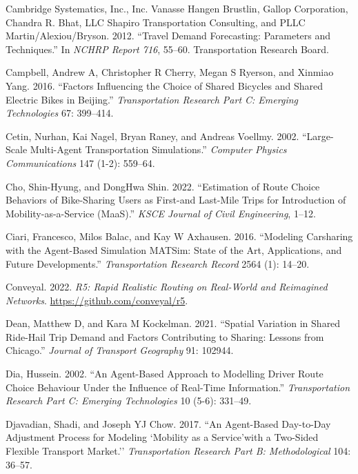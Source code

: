 \documentclass[12pt, oneside, openright]{byuthesis}
\newlength{\cslhangindent}
\newlength{\cslentryspacingunit} %
\newenvironment{CSLReferences}[2] %
 {%
  \setlength{\parindent}{0pt}
  \ifodd #1
  \let\oldpar\par
  \def\par{\hangindent=\cslhangindent\oldpar}
  \fi
  \setlength{\parskip}{#2\cslentryspacingunit}
 }%
 {}
\begin{document}
\begin{CSLReferences}{1}{0}
\leavevmode{}%
Cambridge Systematics, Inc., Inc. Vanasse Hangen Brustlin, Gallop Corporation, Chandra R. Bhat, LLC Shapiro Transportation Consulting, and PLLC Martin/Alexiou/Bryson. 2012. {``Travel Demand Forecasting: Parameters and Techniques.''} In \emph{NCHRP Report 716}, 55--60. Transportation Research Board.

\leavevmode{}%
Campbell, Andrew A, Christopher R Cherry, Megan S Ryerson, and Xinmiao Yang. 2016. {``Factors Influencing the Choice of Shared Bicycles and Shared Electric Bikes in Beijing.''} \emph{Transportation Research Part C: Emerging Technologies} 67: 399--414.

\leavevmode{}%
Cetin, Nurhan, Kai Nagel, Bryan Raney, and Andreas Voellmy. 2002. {``Large-Scale Multi-Agent Transportation Simulations.''} \emph{Computer Physics Communications} 147 (1-2): 559--64.

\leavevmode{}%
Cho, Shin-Hyung, and DongHwa Shin. 2022. {``Estimation of Route Choice Behaviors of Bike-Sharing Users as First-and Last-Mile Trips for Introduction of Mobility-as-a-Service (MaaS).''} \emph{KSCE Journal of Civil Engineering}, 1--12.

\leavevmode{}%
Ciari, Francesco, Milos Balac, and Kay W Axhausen. 2016. {``Modeling Carsharing with the Agent-Based Simulation MATSim: State of the Art, Applications, and Future Developments.''} \emph{Transportation Research Record} 2564 (1): 14--20.

\leavevmode{}%
Conveyal. 2022. \emph{R5: Rapid Realistic Routing on Real-World and Reimagined Networks}. \url{https://github.com/conveyal/r5}.

\leavevmode{}%
Dean, Matthew D, and Kara M Kockelman. 2021. {``Spatial Variation in Shared Ride-Hail Trip Demand and Factors Contributing to Sharing: Lessons from Chicago.''} \emph{Journal of Transport Geography} 91: 102944.

\leavevmode{}%
Dia, Hussein. 2002. {``An Agent-Based Approach to Modelling Driver Route Choice Behaviour Under the Influence of Real-Time Information.''} \emph{Transportation Research Part C: Emerging Technologies} 10 (5-6): 331--49.

\leavevmode{}%
Djavadian, Shadi, and Joseph YJ Chow. 2017. {``An Agent-Based Day-to-Day Adjustment Process for Modeling `Mobility as a Service'with a Two-Sided Flexible Transport Market.''} \emph{Transportation Research Part B: Methodological} 104: 36--57.


\end{CSLReferences}
\end{document}
